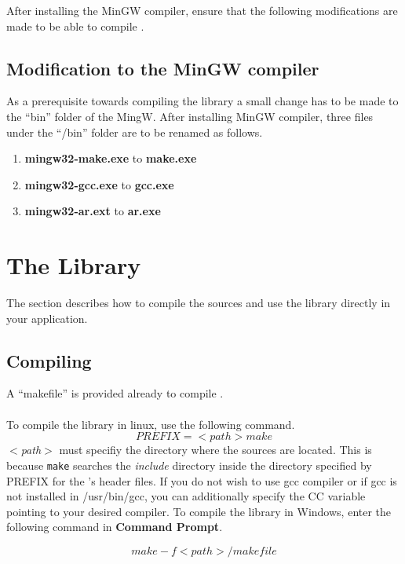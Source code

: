 After installing the MinGW compiler, ensure that the following modifications are made to be able to compile \libalf.

\subsection*{Modification to the MinGW compiler}

As a prerequisite towards compiling the library a small change has to be made to the ``bin'' folder of the MingW.   
After installing MinGW compiler, three files under the ``/bin'' folder are to be renamed as follows.
\begin{enumerate}
 \item \textbf{mingw32-make.exe} to \textbf{make.exe}
 \item \textbf{mingw32-gcc.exe} to \textbf{gcc.exe}
 \item \textbf{mingw32-ar.ext} to \textbf{ar.exe}	
\end{enumerate}
 
\section{The \libalf \cpp Library}
The section describes how to compile the sources and use the \cpp library directly in your application.
\subsection*{Compiling \libalf}
A ``makefile'' is provided already to compile \libalf.
\paragraph{}
To compile the library in linux, use the following command.
\[
  PREFIX = <path> make
\]
\emph{$<$path$>$} must specifiy the directory where the \libalf sources are located. This is because \texttt{make} searches the \emph{include} directory inside the directory specified by PREFIX for the \libalf's header files. If you do not wish to use gcc compiler or if gcc is not installed in /usr/bin/gcc, you can additionally specify the CC variable pointing to your desired \cpp compiler. \vskip 1pt
\reversemarginpar
{} To compile the library in Windows, enter the following command in \textbf{Command Prompt}.

\[
 make -f <path>/makefile
\]
